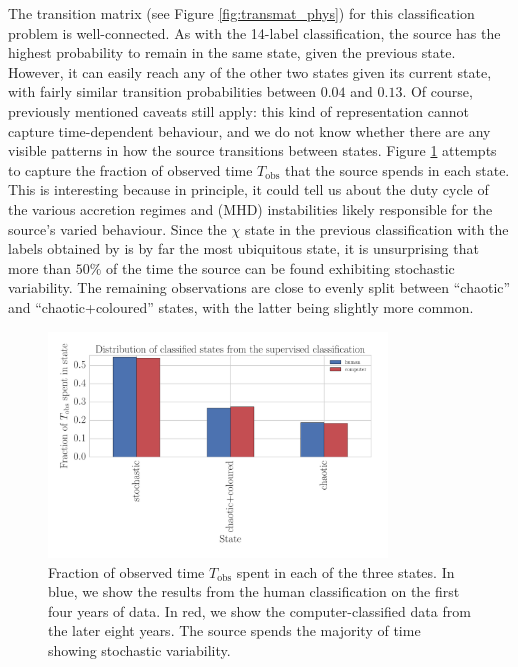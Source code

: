 \documentclass[12pt]{emulateapj}
\begin{document}
The transition matrix (see Figure \ref{fig:transmat_phys}) for this classification problem is well-connected. As with the 14-label classification, the source has the 
highest probability to remain in the same state, given the previous state. However, it can easily reach any of the other two states given its current state, with fairly 
similar transition probabilities between $0.04$ and $0.13$. Of course, previously mentioned caveats still apply: this kind of representation cannot capture time-dependent behaviour, and we do not know whether there are any visible patterns in how the source transitions between states. Figure \ref{fig:duration_phys} attempts to capture the fraction of observed time $T_\mathrm{obs}$ that the source spends in each state. This is interesting because in principle, it could tell us about the duty cycle of the various accretion regimes and (MHD) instabilities likely responsible for the source's varied behaviour.
Since the $\chi$ state in the previous classification with the labels obtained by \citet{belloni2000} is by far the most ubiquitous state, it is unsurprising that more 
than $50\%$ of the time the source can be found exhibiting stochastic variability. The remaining observations are close to evenly split between ``chaotic'' and 
``chaotic+coloured'' states, with the latter being slightly more common.

\begin{figure}[htbp]
\begin{center}
\includegraphics[width=9cm]{grs1915_supervised_phys_states_histogram.pdf}
\caption{Fraction of observed time $T_{\mathrm{obs}}$ spent in each of the three states. In blue, we show the results from the human classification on the first four 
years of data. In red, we show the computer-classified data from the later eight years. The source spends the majority of time showing stochastic variability.} 
\label{fig:duration_phys}
\end{center}
\end{figure}
\end{document}
